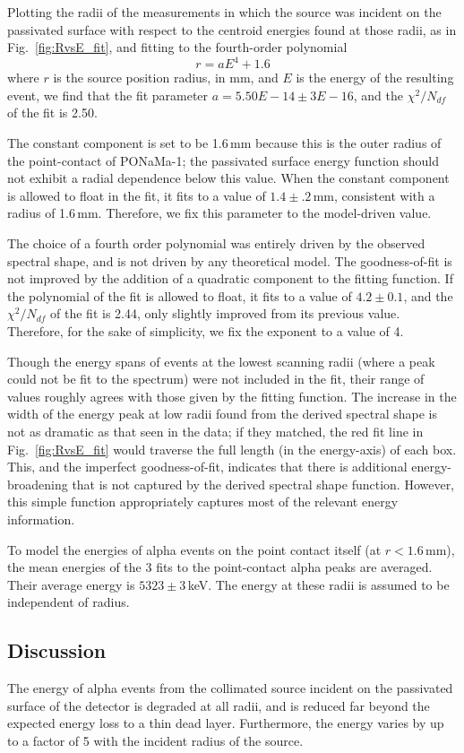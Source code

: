 Plotting the radii of the measurements in which the source was incident on the passivated surface with respect to the centroid energies found at those radii, as in Fig.~\ref{fig:RvsE_fit}, and fitting to the fourth-order polynomial
$$ r = aE^4 + 1.6 $$
where $r$ is the source position radius, in mm, and $E$ is the energy of the resulting event, we find that the fit parameter $a = 5.50E-14\pm3E-16$, and the $\chi^2/N_{df}$ of the fit is 2.50.

The constant component is set to be 1.6\,mm because this is the outer radius of the point-contact of PONaMa-1; the passivated surface energy function should not exhibit a radial dependence below this value. When the constant component is allowed to float in the fit, it fits to a value of $1.4\pm.2$\,mm, consistent with a radius of 1.6\,mm. Therefore, we fix this parameter to the model-driven value. 

The choice of a fourth order polynomial was entirely driven by the observed spectral shape, and is not driven by any theoretical model. The goodness-of-fit is not improved by the addition of a quadratic component to the fitting function. If the polynomial of the fit is allowed to float, it fits to a value of $4.2\pm0.1$, and the $\chi^2/N_{df}$ of the fit is 2.44, only slightly improved from its previous value. Therefore, for the sake of simplicity, we fix the exponent to a value of 4.  

Though the energy spans of events at the lowest scanning radii (where a peak could not be fit to the spectrum) were not included in the fit, their range of values roughly agrees with those given by the fitting function. The increase in the width of the energy peak at low radii found from the derived spectral shape is not as dramatic as that seen in the data; if they matched, the red fit line in Fig.~\ref{fig:RvsE_fit} would traverse the full length (in the energy-axis) of each box. This, and the imperfect goodness-of-fit, indicates that there is additional energy-broadening that is not captured by the derived spectral shape function. However, this simple function appropriately captures most of the relevant energy information. 

To model the energies of alpha events on the point contact itself (at $r<1.6$\,mm), the mean energies of the 3 fits to the point-contact alpha peaks are averaged. Their average energy is $5323\pm3$\,keV. The energy at these radii is assumed to be independent of radius. 

\subsection{Discussion}
The energy of alpha events from the collimated source incident on the passivated surface of the detector is degraded at all radii, and is reduced far beyond the expected energy loss to a thin dead layer. Furthermore, the energy varies by up to a factor of 5 with the incident radius of the source. 

